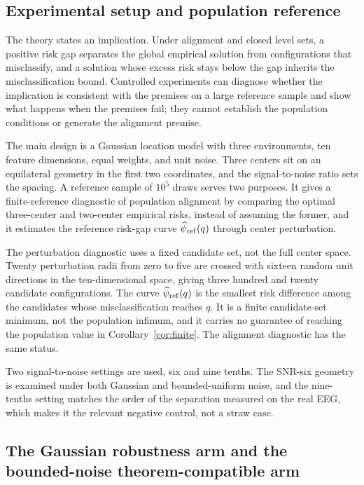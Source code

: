 \subsection{Experimental setup and population
reference}\label{experimental-setup-and-population-reference}

The theory states an implication. Under alignment and closed level sets,
a positive risk gap separates the global empirical solution from
configurations that misclassify, and a solution whose excess risk stays
below the gap inherits the misclassification bound. Controlled
experiments can diagnose whether the implication is consistent with the
premises on a large reference sample and show what happens when the
premises fail; they cannot establish the population conditions or
generate the alignment premise.

The main design is a Gaussian location model with three environments,
ten feature dimensions, equal weights, and unit noise. Three centers sit
on an equilateral geometry in the first two coordinates, and the
signal-to-noise ratio sets the spacing. A reference sample of \(10^5\)
draws serves two purposes. It gives a finite-reference diagnostic of
population alignment by comparing the optimal three-center and
two-center empirical risks, instead of assuming the former, and it
estimates the reference risk-gap curve \(\widehat\psi_{\rm ref}(q)\)
through center perturbation.

The perturbation diagnostic uses a fixed candidate set, not the full
center space. Twenty perturbation radii from zero to five are crossed
with sixteen random unit directions in the ten-dimensional space, giving
three hundred and twenty candidate configurations. The curve
\(\widehat\psi_{\rm ref}(q)\) is the smallest risk difference among the
candidates whose misclassification reaches \(q\). It is a finite
candidate-set minimum, not the population infimum, and it carries no
guarantee of reaching the population value in
Corollary~\ref{cor:finite}. The alignment diagnostic has
the same status.

Two signal-to-noise settings are used, six and nine tenths. The SNR-six
geometry is examined under both Gaussian and bounded-uniform noise, and
the nine-tenths setting matches the order of the separation measured on
the real EEG, which makes it the relevant negative control, not a straw
case.

\subsection{The Gaussian robustness arm and the bounded-noise
theorem-compatible
arm}\label{the-gaussian-robustness-arm-and-the-bounded-noise-theorem-compatible-arm}

